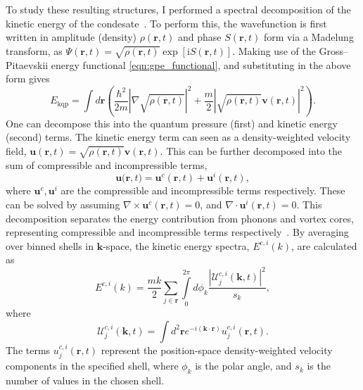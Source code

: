 To study these resulting structures, I performed a spectral decomposition of the kinetic energy of the condesate~\cite{CT:Nore_prl_1997,CT:Nore_pof_1997,CT:Bradley_prx_2012}. To perform this, the wavefunction is first written in amplitude (density) $\rho(\mathbf{r},t)$ and phase $S(\mathbf{r},t)$ form via a Madelung transform, as
$
		\Psi(\mathbf{r},t) = \sqrt{\rho(\mathbf{r},t)}\exp{\left[\mathrm{i}S(\mathbf{r},t)\right]}.
$
Making use of the Gross--Pitaevskii energy functional \ref{eqn:gpe_functional}, and substituting in the above form gives
\begin{equation}
    E_{\text{kqp}} = \int d\mathbf{r} \left( \frac{\hbar^2}{2m}| \nabla\sqrt{\rho(\mathbf{r},t)} |^2  + \frac{m}{2}|\sqrt{\rho(\mathbf{r},t)}\mathbf{v}(\mathbf{r},t) |^2\right).
\end{equation}
One can decompose this into the quantum pressure (first) and kinetic energy (second) terms. The kinetic energy term can seen as a density-weighted velocity field, $\mathbf{u}(\mathbf{r},t) = \sqrt{\rho(\mathbf{r},t)}\mathbf{v}(\mathbf{r},t)$. This can be further decomposed into the sum of compressible and incompressible terms,
\begin{equation}
    \mathbf{u(r},t) = \mathbf{u}^c(\mathbf{r},t) + \mathbf{u}^i(\mathbf{r},t),
\end{equation}
where $\mathbf{u}^c, \mathbf{u}^i$ are the compressible and incompressible terms respectively. These can be solved by assuming $\nabla \times \mathbf{u}^c(\mathbf{r},t) = 0$, and $\nabla \cdot \mathbf{u}^i(\mathbf{r},t) = 0$. This decomposition separates the energy contribution from phonons and vortex cores, representing compressible and incompressible terms respectively~\cite{CT:Horng_pra_2009}. By averaging over binned shells in $\mathbf{k}$-space, the kinetic energy spectra, $E^{c,i}(k)$, are calculated as~\cite{CT:Bradley_prx_2012}
\begin{equation}
	E^{c,i}(k) = \frac{mk}{2}\sum\limits_{j\in\mathbf{r}} \int\limits_{0}^{2\pi}d\phi_k \frac{ |\mathcal{U}_j^{c,i}(\mathbf{k},t) |^2}{s_k},
\end{equation}
where
\begin{equation}
	\mathcal{U}_j^{c,i}(\mathbf{k},t) = \int d^2 \mathbf{r} e^{-i(\mathbf{k}\cdot\mathbf{r})} u_j^{c,i}(\mathbf{r},t).
\end{equation}
The terms $u_j^{c,i}(\mathbf{r},t)$ represent the position-space density-weighted velocity components in the specified shell, where $\phi_k$ is the polar angle, and $s_k$ is the number of values in the chosen shell.

